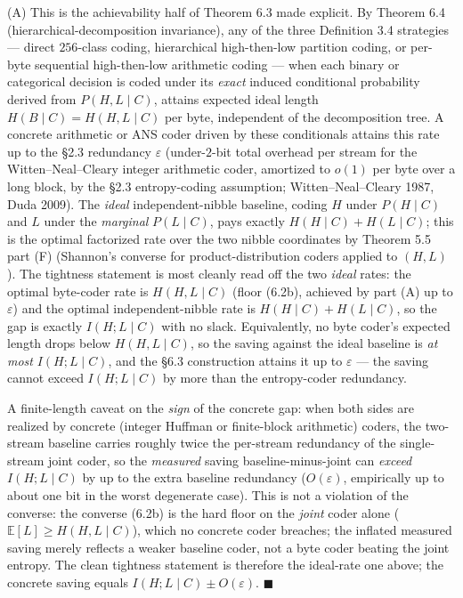 \documentclass[
]{article}
\begin{document}
(A) This is the achievability half of Theorem 6.3 made explicit. By
Theorem 6.4 (hierarchical-decomposition invariance), any of the three
Definition 3.4 strategies --- direct $256$-class coding, hierarchical
high-then-low partition coding, or per-byte sequential high-then-low
arithmetic coding --- when each binary or categorical decision is
coded under its \emph{exact} induced conditional probability derived
from $P(H, L \mid C)$, attains expected ideal length
$H(B \mid C) = H(H, L \mid C)$ per byte, independent of the
decomposition tree. A concrete arithmetic or ANS coder driven by
these conditionals attains this rate up to the §2.3 redundancy
$\varepsilon$ (under-$2$-bit total overhead per stream for the
Witten--Neal--Cleary integer arithmetic coder, amortized to $o(1)$
per byte over a long block, by the §2.3 entropy-coding assumption;
Witten--Neal--Cleary 1987, Duda 2009). The \emph{ideal} independent-nibble
baseline, coding $H$ under $P(H \mid C)$ and $L$ under the
\emph{marginal} $P(L \mid C)$, pays exactly $H(H \mid C) + H(L \mid C)$;
this is the optimal factorized rate over the two nibble coordinates by
Theorem 5.5 part (F) (Shannon's converse for product-distribution
coders applied to $(H, L)$). The tightness statement is most cleanly
read off the two \emph{ideal} rates: the optimal byte-coder rate is
$H(H, L \mid C)$ (floor (6.2b), achieved by part (A) up to
$\varepsilon$) and the optimal independent-nibble rate is
$H(H \mid C) + H(L \mid C)$, so the gap is exactly $I(H ; L \mid C)$
with no slack. Equivalently, no byte coder's expected length drops
below $H(H, L \mid C)$, so the saving against the ideal baseline is
\emph{at most} $I(H ; L \mid C)$, and the §6.3 construction attains it
up to $\varepsilon$ --- the saving cannot exceed $I(H ; L \mid C)$ by
more than the entropy-coder redundancy.

A finite-length caveat on the \emph{sign} of the concrete gap: when
both sides are realized by concrete (integer Huffman or finite-block
arithmetic) coders, the two-stream baseline carries roughly twice the
per-stream redundancy of the single-stream joint coder, so the
\emph{measured} saving baseline-minus-joint can \emph{exceed}
$I(H ; L \mid C)$ by up to the extra baseline redundancy ($O(\varepsilon)$,
empirically up to about one bit in the worst degenerate case). This is
not a violation of the converse: the converse (6.2b) is the hard floor
on the \emph{joint} coder alone ($\mathbb{E}[L] \geq H(H,L\mid C)$),
which no concrete coder breaches; the inflated measured saving merely
reflects a weaker baseline coder, not a byte coder beating the joint
entropy. The clean tightness statement is therefore the ideal-rate one
above; the concrete saving equals $I(H ; L \mid C) \pm O(\varepsilon)$.
\hfill$\blacksquare$
\end{document}
